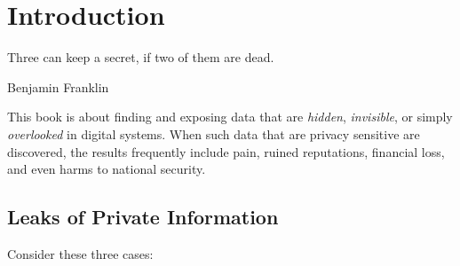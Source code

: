 \chapter{Introduction}\label{ch:introduction}
\setlength{\epigraphwidth}{3in}
\epigraph{Three can keep a secret, if two of them are dead.}{Benjamin
  Franklin}

This book is about finding and exposing data that are \emph{hidden},
\emph{invisible}, or simply \emph{overlooked} in digital systems. When
such data that are privacy sensitive are discovered, the results
frequently include pain, ruined
reputations, financial loss, and even harms to national
security. 

\section{Leaks of Private Information \DONE}

Consider these three cases:


